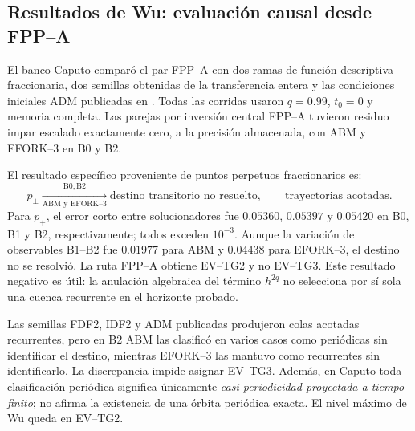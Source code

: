 \subsection{Resultados de Wu: evaluación causal desde FPP--A}
\label{subsec:pilot-wu-results}

El banco Caputo comparó el par FPP--A con dos ramas de función descriptiva
fraccionaria, dos semillas obtenidas de la transferencia entera y las
condiciones iniciales ADM publicadas en \cite{Wu2023ArctanChua}. Todas las
corridas usaron $q=0.99$, $t_0=0$ y memoria completa. Las parejas por inversión
central FPP--A tuvieron residuo impar escalado exactamente cero, a la precisión
almacenada, con ABM y EFORK--3 en B0 y B2.

El resultado específico proveniente de puntos perpetuos fraccionarios es:
\begin{equation}
 p_\pm\xrightarrow[\text{ABM y EFORK--3}]{\mathrm{B0,B2}}
 \text{destino transitorio no resuelto},\qquad \text{trayectorias acotadas}.
 \label{pilot:eq-wu-fppa-destination}
\end{equation}
Para $p_+$, el error corto entre solucionadores fue $0.05360$, $0.05397$ y
$0.05420$ en B0, B1 y B2, respectivamente; todos exceden $10^{-3}$. Aunque la
variación de observables B1--B2 fue $0.01977$ para ABM y $0.04438$ para
EFORK--3, el destino no se resolvió. La ruta FPP--A obtiene EV--TG2 y no
EV--TG3. Este resultado negativo es útil: la anulación algebraica del término
$h^{2q}$ no selecciona por sí sola una cuenca recurrente en el horizonte
probado.

Las semillas FDF2, IDF2 y ADM publicadas produjeron colas acotadas recurrentes,
pero en B2 ABM las clasificó en varios casos como periódicas sin identificar el
destino, mientras EFORK--3 las mantuvo como recurrentes sin identificarlo. La
discrepancia impide asignar EV--TG3. Además, en Caputo toda clasificación periódica
significa únicamente
\emph{casi periodicidad proyectada a tiempo finito}; no afirma la existencia de
una órbita periódica exacta. El nivel máximo de Wu queda en EV--TG2.


